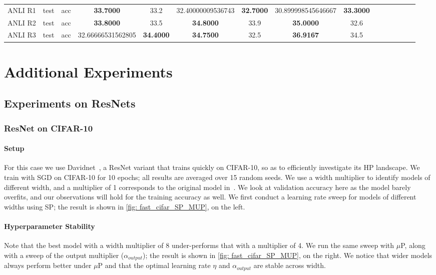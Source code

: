 \documentclass{article}
\theoremstyle{definition}
\begin{document}
\begin{table}
\begin{tabular}{lllSSSSSSSSSSSS}
    ANLI R1 & test & acc &
    \bfseries 33.7000 & 33.2 &
    32.40000009536743 & \bfseries 32.7000 &
    30.899998545646667 & \bfseries 33.3000 
    \\

    ANLI R2 & test & acc &
    \bfseries 33.8000 & 33.5 &
    \bfseries 34.8000 & 33.9 &
    \bfseries 35.0000 & 32.6 
    \\

    ANLI R3 & test & acc &
    32.66666531562805 & \bfseries 34.4000 &
    \bfseries 34.7500 & 32.5 &
    \bfseries 36.9167 & 34.5 
    \\

\bottomrule
\end{tabular}
\end{table}

\section{Additional Experiments}

\subsection{Experiments on ResNets}
\label{sec:resnetexperiments}

\subsubsection{ResNet on CIFAR-10}
\label{sec:resnetcifar10experiments}

\paragraph{Setup}
For this case we use Davidnet~\cite{davidnet}, a ResNet variant that trains quickly on CIFAR-10, so as to efficiently investigate its HP landscape.
We train with SGD on CIFAR-10 for 10 epochs; all results are averaged over 15 random seeds.
We use a width multiplier to identify models of different width, and a multiplier of 1 corresponds to the original model in~\cite{davidnet}.
We look at validation accuracy here as the model barely overfits, and our observations will hold for the training accuracy as well.
We first conduct a learning rate sweep for models of different widths using SP; the result is shown in \cref{fig: fast_cifar_SP_MUP}, on the left.

\paragraph{Hyperparameter Stability}
Note that the best model with a width multiplier of 8 under-performs that with a multiplier of 4.
We run the same sweep with $\mu$P, along with a sweep of the output multiplier ($\alpha_{output}$); the result is shown in \cref{fig: fast_cifar_SP_MUP}, on the right.
We notice that wider models always perform better under $\mu$P and that the optimal learning rate $\eta$ and $\alpha_{output}$ are stable across width.
\end{document}
